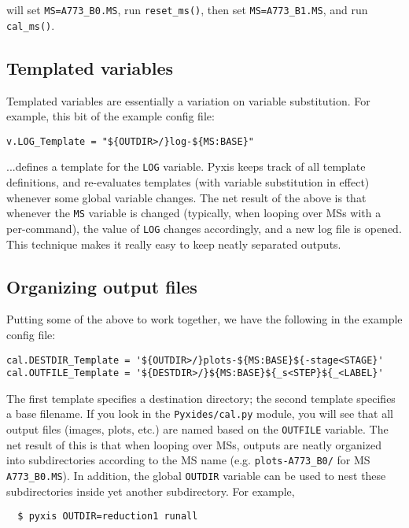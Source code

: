 \documentclass[a4paper,10pt]{article}
\begin{document}
will set {\tt MS=A773\_B0.MS}, run {\tt reset\_ms()}, then set {\tt MS=A773\_B1.MS}, and run {\tt cal\_ms()}.


\subsection{Templated variables}

Templated variables are essentially a variation on variable substitution. For example, this bit of the example config file:

\begin{verbatim}
v.LOG_Template = "${OUTDIR>/}log-${MS:BASE}"
\end{verbatim}

...defines a template for the {\tt LOG} variable. Pyxis keeps track of all template definitions, and re-evaluates 
templates (with variable substitution in effect) whenever some global variable changes. The net result of the above is that
whenever the {\tt MS} variable is changed (typically, when looping over MSs with a per-command), the value of {\tt LOG} changes accordingly, and a new log file is opened. This technique makes it really easy to keep neatly separated outputs.

\subsection{Organizing output files}

Putting some of the above to work together, we have the following in the example config file:

\begin{verbatim}
cal.DESTDIR_Template = '${OUTDIR>/}plots-${MS:BASE}${-stage<STAGE}'
cal.OUTFILE_Template = '${DESTDIR>/}${MS:BASE}${_s<STEP}${_<LABEL}'
\end{verbatim}

The first template specifies a destination directory; the second template specifies a base filename. If you look in the {\tt Pyxides/cal.py} module, you will see that all output files (images, plots, etc.) are named based on the {\tt OUTFILE} variable.
The net result of this is that when looping over MSs, outputs are neatly organized into subdirectories according to the MS name (e.g. {\tt plots-A773\_B0/} for MS {\tt A773\_B0.MS}). In addition, the global {\tt OUTDIR} variable can be used to nest these
subdirectories inside yet another subdirectory. For example,

\begin{verbatim}
  $ pyxis OUTDIR=reduction1 runall
\end{verbatim}
\end{document}
